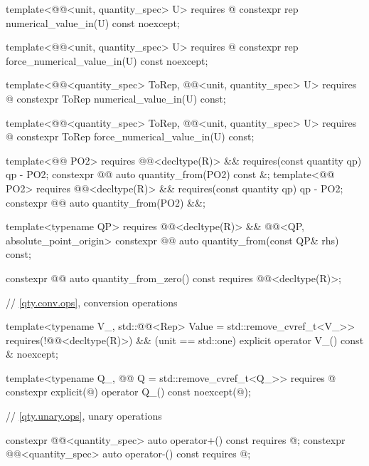 \begin{codeblock}
{{  template<@@<unit, quantity_spec> U>
    requires @\seebelownc@
  constexpr rep numerical_value_in(U) const noexcept;

  template<@@<unit, quantity_spec> U>
    requires @\seebelownc@
  constexpr rep force_numerical_value_in(U) const noexcept;

  template<@@<quantity_spec> ToRep, @@<unit, quantity_spec> U>
    requires @\seebelownc@
  constexpr ToRep numerical_value_in(U) const;

  template<@@<quantity_spec> ToRep, @@<unit, quantity_spec> U>
    requires @\seebelownc@
  constexpr ToRep force_numerical_value_in(U) const;

  template<@@ PO2>
    requires @@<decltype(R)> && requires(const quantity qp) { qp - PO2{}; }
  constexpr @@ auto quantity_from(PO2) const &;
  template<@@ PO2>
    requires @@<decltype(R)> && requires(const quantity qp) { qp - PO2{}; }
  constexpr @@ auto quantity_from(PO2) &&;

  template<typename QP>
    requires @@<decltype(R)> && @@<QP, absolute_point_origin>
  constexpr @@ auto quantity_from(const QP& rhs) const;

  constexpr @@ auto quantity_from_zero() const
    requires @@<decltype(R)>;

  // \ref{qty.conv.ops}, conversion operations

  template<typename V_, std::@@<Rep> Value = std::remove_cvref_t<V_>>
    requires(!@@<decltype(R)>) && (unit == std::one)
  explicit operator V_() const & noexcept;

  template<typename Q_, @@ Q = std::remove_cvref_t<Q_>>
    requires @\seebelownc@
  constexpr explicit(@\seebelownc@) operator Q_() const noexcept(@\seebelownc@);

  // \ref{qty.unary.ops}, unary operations

  constexpr @@<quantity_spec> auto operator+() const
    requires @\seebelownc@;
  constexpr @@<quantity_spec> auto operator-() const
    requires @\seebelownc@;

}}
\end{codeblock}
